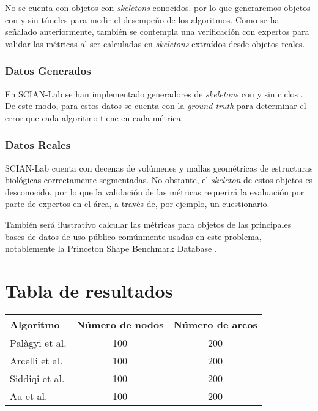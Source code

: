No se cuenta con objetos con \textit{skeletons} conocidos. por lo que generaremos objetos con y sin túneles para medir el desempeño de los algoritmos. Como se ha señalado anteriormente, también se contempla una verificación con expertos para validar las métricas al ser calculadas en \textit{skeletons} extraídos desde objetos reales.

\subsubsection{Datos Generados}

En SCIAN-Lab se han implementado generadores de \textit{skeletons} con y sin ciclos \cite{villarroel2012}. De este modo, para estos datos se cuenta con la \textit{ground truth} para determinar el error que cada algoritmo tiene en cada métrica.

\subsubsection{Datos Reales}

SCIAN-Lab cuenta con decenas de volúmenes y mallas geométricas de estructuras biológicas correctamente segmentadas. No obstante, el \textit{skeleton} de estos objetos es desconocido, por lo que la validación de las métricas requerirá la evaluación por parte de expertos en el área, a través de, por ejemplo, un cuestionario.

También será ilustrativo calcular las métricas para objetos de las principales bases de datos de uso público comúnmente usadas en este problema, notablemente la Princeton Shape Benchmark Database \cite{shilane2004princeton}.

\section{Tabla de resultados}

\begin{center}
    \begin{tabular}{ | l | c | c |}
    \hline
    Algoritmo & Número de nodos & Número de arcos \\ \hline
    Palàgyi et al.& 100 & 200 \\ \hline
    Arcelli et al.& 100 & 200 \\ \hline
    Siddiqi et al.& 100 & 200 \\ \hline
    Au et al.& 100 & 200 \\ \hline
    \end{tabular}
\end{center}